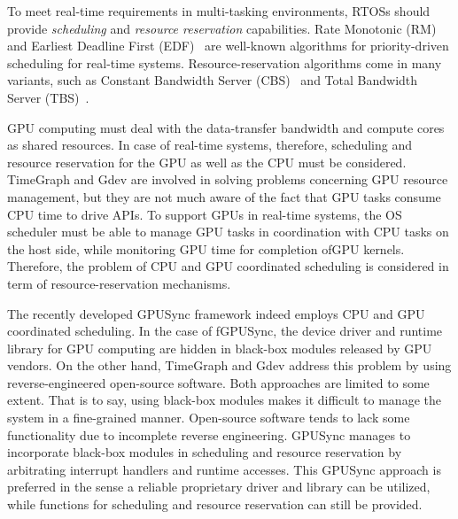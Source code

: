 To meet real-time requirements in multi-tasking environments, RTOSs should provide \textit{scheduling} and \textit{resource reservation} capabilities.
Rate Monotonic (RM) and Earliest Deadline First (EDF)~\cite{sched:ll} are well-known algorithms for priority-driven scheduling for real-time systems.
Resource-reservation algorithms come in many variants, such as Constant Bandwidth Server (CBS)~\cite{rr:cbs} and Total Bandwidth Server (TBS)~\cite{rr:tbs2}.

GPU computing must deal with the data-transfer bandwidth and compute cores as shared resources.
In case of real-time systems, therefore, scheduling and resource reservation for the GPU as well as the CPU must be considered.
TimeGraph and Gdev are involved in solving problems concerning GPU resource management, but they are not much aware of the fact that GPU tasks consume CPU time to drive APIs.
To support GPUs in real-time systems, the OS scheduler must be able to manage GPU tasks in coordination with CPU tasks on the host side, while monitoring GPU time for completion ofGPU kernels.
Therefore, the problem of CPU and GPU coordinated scheduling is considered in term of resource-reservation mechanisms.

The recently developed GPUSync framework indeed employs CPU and GPU coordinated scheduling.
In the case of fGPUSync, the device driver and runtime library for GPU computing are hidden in black-box modules released by GPU vendors.
On the other hand, TimeGraph and Gdev address this problem by using reverse-engineered open-source software.
Both approaches are limited to some extent.
That is to say, using black-box modules makes it difficult to manage the system in a fine-grained manner.
Open-source software tends to lack some functionality due to incomplete reverse engineering.
GPUSync manages to incorporate black-box modules in scheduling and resource reservation by arbitrating interrupt handlers and runtime accesses.
This GPUSync approach is preferred in the sense a reliable proprietary driver and library can be utilized, while functions for scheduling and resource reservation can still be provided.

